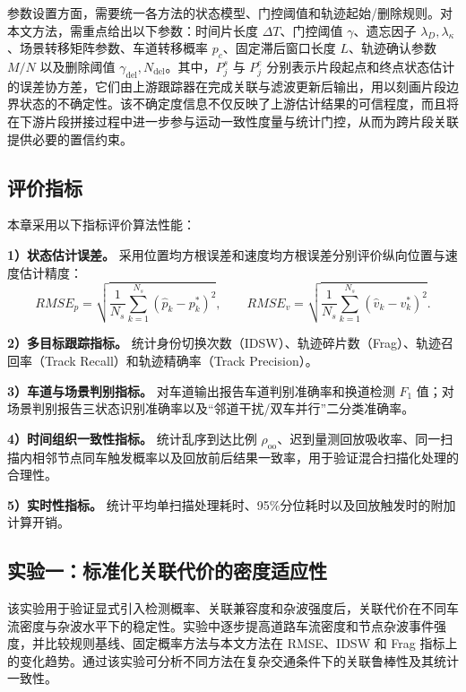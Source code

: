 \documentclass{xdupgthesis}
\begin{document}
参数设置方面，需要统一各方法的状态模型、门控阈值和轨迹起始/删除规则。对本文方法，需重点给出以下参数：时间片长度 $\Delta T$、门控阈值 $\gamma$、遗忘因子 $\lambda_D,\lambda_{\kappa}$、场景转移矩阵参数、车道转移概率 $p_c$、固定滞后窗口长度 $L$、轨迹确认参数 $M/N$ 以及删除阈值 $\gamma_{\mathrm{del}},N_{\mathrm{del}}$。其中，$P_j^{s}$ 与 $P_j^{e}$ 分别表示片段起点和终点状态估计的误差协方差，它们由上游跟踪器在完成关联与滤波更新后输出，用以刻画片段边界状态的不确定性。该不确定度信息不仅反映了上游估计结果的可信程度，而且将在下游片段拼接过程中进一步参与运动一致性度量与统计门控，从而为跨片段关联提供必要的置信约束。

\subsection{评价指标}

本章采用以下指标评价算法性能：

\textbf{1）状态估计误差。} 采用位置均方根误差和速度均方根误差分别评价纵向位置与速度估计精度：
\begin{equation}
	RMSE_p=
	\sqrt{\frac{1}{N_s}\sum_{k=1}^{N_s}(\hat p_k-p_k^{\ast})^2},
	\qquad
	RMSE_v=
	\sqrt{\frac{1}{N_s}\sum_{k=1}^{N_s}(\hat v_k-v_k^{\ast})^2}.
	\label{eq:ch3_rmse_v2}
\end{equation}

\textbf{2）多目标跟踪指标。} 统计身份切换次数（IDSW）、轨迹碎片数（Frag）、轨迹召回率（Track Recall）和轨迹精确率（Track Precision）。

\textbf{3）车道与场景判别指标。} 对车道输出报告车道判别准确率和换道检测 $F_1$ 值；对场景判别报告三状态识别准确率以及“邻道干扰/双车并行”二分类准确率。

\textbf{4）时间组织一致性指标。} 统计乱序到达比例 $\rho_{\mathrm{oo}}$、迟到量测回放吸收率、同一扫描内相邻节点同车触发概率以及回放前后结果一致率，用于验证混合扫描化处理的合理性。

\textbf{5）实时性指标。} 统计平均单扫描处理耗时、95\%分位耗时以及回放触发时的附加计算开销。

\subsection{实验一：标准化关联代价的密度适应性}

该实验用于验证显式引入检测概率、关联兼容度和杂波强度后，关联代价在不同车流密度与杂波水平下的稳定性。实验中逐步提高道路车流密度和节点杂波事件强度，并比较规则基线、固定概率方法与本文方法在 RMSE、IDSW 和 Frag 指标上的变化趋势。通过该实验可分析不同方法在复杂交通条件下的关联鲁棒性及其统计一致性。
\end{document}
